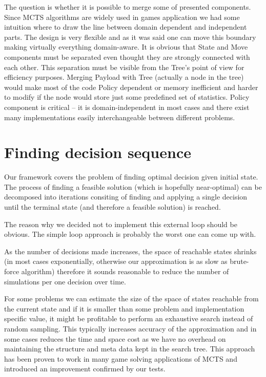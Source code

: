 The question is whether it is possible to merge some of presented components.
Since MCTS algorithms are widely used in games application we had some
intuition where to draw the line between domain dependent and independent
parts. The design is very flexible and as it was said one can move this
boundary making virtually everything domain-aware. It is obvious that State
and Move components must be separated even thought they are strongly connected
with each other. This separation must be visible from the Tree's point of view
for efficiency purposes.
Merging Payload with Tree (actually a node in the tree) would make most of the
code Policy dependent or memory inefficient and harder to modify if the node
would store just some predefined set of statistics.
Policy component is critical -- it is domain-independent in most cases and
there exist many implementations easily interchangeable between different
problems.

\section{Finding decision sequence}
Our framework covers the problem of finding optimal decision given initial
state. The process of finding a feasible solution (which is hopefully
near-optimal) can be decomposed into iterations consiting of finding and applying 
a single decision until the terminal state
(and therefore a feasible solution) is reached.

The reason why we decided not to implement this external loop should be
obvious. The simple loop approach is probably the worst one can come up with.

As the number of decisions made increases, the space of reachable states shrinks
(in most cases exponentially, otherwise our approximation is as slow as brute-force
algorithm) therefore it sounds reasonable to reduce the number of simulations
per one decision over time.

For some problems we can estimate the size of the space of states reachable from
the current state and if it is smaller than some problem and implementation
specific value, it might be profitable to perform an exhaustive search instead
of random sampling. This typically increases accuracy of the approximation and
in some cases reduces the time and space cost as we have no overhead on maintaining
the structure and meta data kept in the search tree. This approach has been proven
to work in many game solving applications of MCTS and introduced an improvement
confirmed by our tests.

